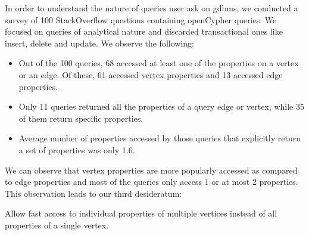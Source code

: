 \begin{guideline}
	In order to understand the nature of queries user ask on \gls{gdbms}, we conducted a survey of 100 StackOverflow questions containing openCypher queries. We focused on queries of analytical nature and discarded transactional ones like insert, delete and update. We observe the following: 
	
	
	\begin{itemize}
		
		\item Out of the 100 queries, 68 accessed at least one of the properties on a vertex or an edge. Of these, 61 accessed vertex properties and 13 accessed edge properties.
		
		\item Only 11 queries returned all the properties of a query edge or vertex, while 35 of them return specific properties.
		
		\item Average number of properties accessed by those queries that explicitly return a set of properties was only 1.6.
		
	\end{itemize}
	
	We can observe that vertex properties are more popularly accessed as compared to edge properties and most of the queries only access 1 or at most 2 properties. This observation leads to our third desideratum:
	
	\begin{desideratum}
		Allow fast access to individual properties of multiple vertices instead of all properties of a single vertex.
	\end{desideratum}
	
\end{guideline}
